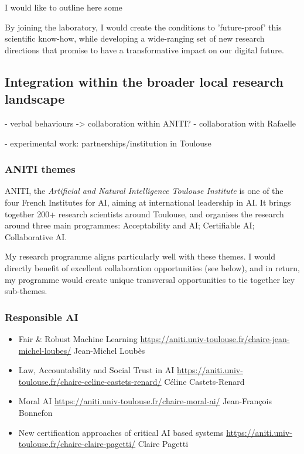 I would like to outline here some

By joining the laboratory, I would create the conditions to
'future-proof' this scientific know-how, while developing a wide-ranging set of
new research directions that promise to have a transformative impact on our
digital future.

\newpage
\subsection{Integration within the broader local research landscape}\label{collaborations}


- verbal behaviours -> collaboration within ANITI?
- collaboration with Rafaelle

- experimental work: partnerships/institution in Toulouse


\subsubsection{ANITI themes}

ANITI, the \emph{Artificial and Natural Intelligence Toulouse Institute} is one
of the four French Institutes for AI, aiming at international leadership in AI.
It brings together 200+ research scientists around Toulouse, and organises the
research around three main programmes: Acceptability and AI; Certifiable AI;
Collaborative AI.

My research programme aligns particularly well with these themes. I would
directly benefit of excellent collaboration opportunities (see below), and in
return, my programme would create unique transversal opportunities to tie
together key sub-themes.

\subsubsection{Responsible AI}


\begin{itemize}
    \item Fair \& Robust Machine Learning
        \url{https://aniti.univ-toulouse.fr/chaire-jean-michel-loubes/}
Jean-Michel Loubès

\item Law, Accountability and Social Trust in AI
    \url{https://aniti.univ-toulouse.fr/chaire-celine-castets-renard/}
Céline Castets-Renard

\item Moral AI
    \url{https://aniti.univ-toulouse.fr/chaire-moral-ai/}
Jean-François Bonnefon

\item New certification approaches of critical AI based systems 
    \url{https://aniti.univ-toulouse.fr/chaire-claire-pagetti/}
Claire Pagetti

\end{itemize}

